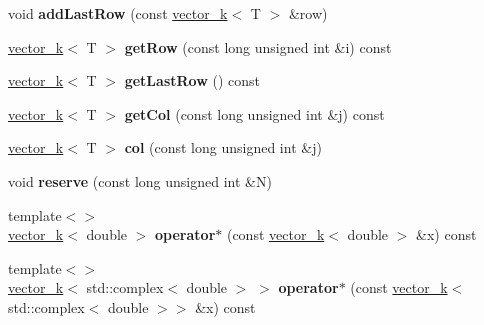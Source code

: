 \begin{DoxyCompactItemize}
\item 
\hypertarget{classkeycpp_1_1matrix_a5cbaeebb6b9c8d87656728c8f2183119}{void {\bfseries add\-Last\-Row} (const \hyperlink{classkeycpp_1_1vector__k}{vector\-\_\-k}$<$ T $>$ \&row)}\label{classkeycpp_1_1matrix_a5cbaeebb6b9c8d87656728c8f2183119}

\item 
\hypertarget{classkeycpp_1_1matrix_ae2a7a1a14ded018f2b3740ff3a8ca6a1}{\hyperlink{classkeycpp_1_1vector__k}{vector\-\_\-k}$<$ T $>$ {\bfseries get\-Row} (const long unsigned int \&i) const }\label{classkeycpp_1_1matrix_ae2a7a1a14ded018f2b3740ff3a8ca6a1}

\item 
\hypertarget{classkeycpp_1_1matrix_aa37578e0da4d4f7531feed0627846a5a}{\hyperlink{classkeycpp_1_1vector__k}{vector\-\_\-k}$<$ T $>$ {\bfseries get\-Last\-Row} () const }\label{classkeycpp_1_1matrix_aa37578e0da4d4f7531feed0627846a5a}

\item 
\hypertarget{classkeycpp_1_1matrix_a3a24c261103af23606ca1505144869d5}{\hyperlink{classkeycpp_1_1vector__k}{vector\-\_\-k}$<$ T $>$ {\bfseries get\-Col} (const long unsigned int \&j) const }\label{classkeycpp_1_1matrix_a3a24c261103af23606ca1505144869d5}

\item 
\hypertarget{classkeycpp_1_1matrix_a1f70c345e600bae285d2ceb4ec616fc2}{\hyperlink{classkeycpp_1_1vector__k}{vector\-\_\-k}$<$ T $>$ {\bfseries col} (const long unsigned int \&j)}\label{classkeycpp_1_1matrix_a1f70c345e600bae285d2ceb4ec616fc2}

\item 
\hypertarget{classkeycpp_1_1matrix_a453f9c8670ff98dda14dcc9b656a5958}{void {\bfseries reserve} (const long unsigned int \&N)}\label{classkeycpp_1_1matrix_a453f9c8670ff98dda14dcc9b656a5958}

\item 
\hypertarget{classkeycpp_1_1matrix_a83c99c62f50eca6f4ddee84bc48ebdbc}{{\footnotesize template$<$$>$ }\\\hyperlink{classkeycpp_1_1vector__k}{vector\-\_\-k}$<$ double $>$ {\bfseries operator$\ast$} (const \hyperlink{classkeycpp_1_1vector__k}{vector\-\_\-k}$<$ double $>$ \&x) const}\label{classkeycpp_1_1matrix_a83c99c62f50eca6f4ddee84bc48ebdbc}

\item 
\hypertarget{classkeycpp_1_1matrix_a472df909e5b8722de11df74046817db9}{{\footnotesize template$<$$>$ }\\\hyperlink{classkeycpp_1_1vector__k}{vector\-\_\-k}$<$ std\-::complex$<$ double $>$ $>$ {\bfseries operator$\ast$} (const \hyperlink{classkeycpp_1_1vector__k}{vector\-\_\-k}$<$ std\-::complex$<$ double $>$$>$ \&x) const}\label{classkeycpp_1_1matrix_a472df909e5b8722de11df74046817db9}


\end{DoxyCompactItemize}
